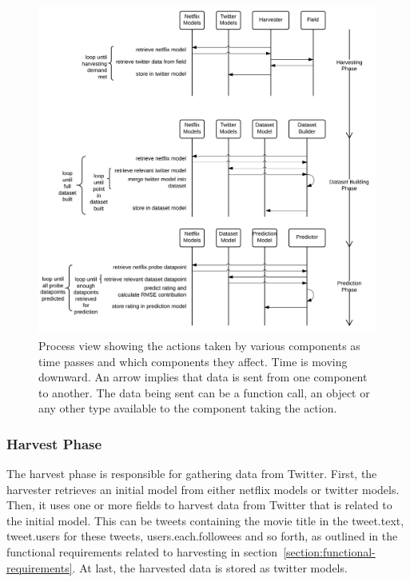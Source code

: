 \begin{figure}[H]
\centerline{\includegraphics[width=7in]{image/architecture-process-view.png}}
\caption{Process view showing the actions taken by various components as time passes and which components they affect. Time is moving downward. An arrow implies that data is sent from one component to another. The data being sent can be a function call, an object or any other type available to the component taking the action.}
\label{figure:process-view}
\end{figure}

\subsubsection{Harvest Phase}
The harvest phase is responsible for gathering data from Twitter. First, the harvester retrieves an initial model from either netflix models or twitter models. Then, it uses one or more fields to harvest data from Twitter that is related to the initial model. This can be tweets containing the movie title in the tweet.text, tweet.users for these tweets, users.each.followees and so forth, as outlined in the functional requirements related to harvesting in section~\ref{section:functional-requirements}. At last, the harvested data is stored as twitter models.

